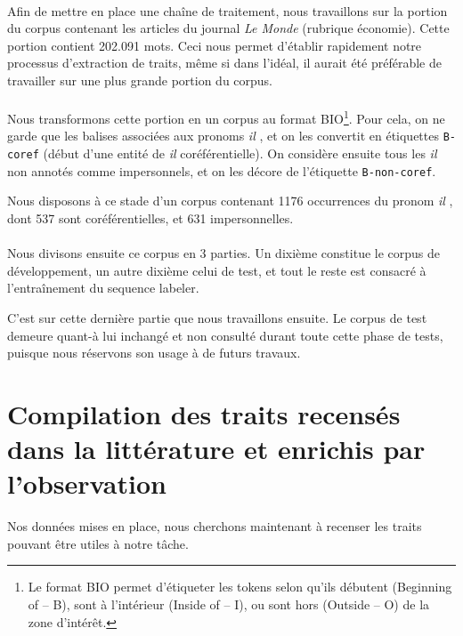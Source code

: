 \documentclass[a4paper,12pt]{article}
\begin{document}
\paragraph{}
Afin de mettre en place une chaîne de traitement, nous travaillons sur la portion du corpus contenant les articles du journal \emph{Le Monde} (rubrique économie). Cette portion contient 202.091 mots. Ceci nous permet d'établir rapidement notre processus d'extraction de traits, même si dans l'idéal, il aurait été préférable de travailler sur une plus grande portion du corpus.

\paragraph{}
Nous transformons cette portion en un corpus au format BIO\footnote{Le format BIO permet d'étiqueter les tokens selon qu'ils débutent (Beginning of -- B), sont à l'intérieur (Inside of -- I), ou sont hors (Outside -- O) de la zone d'intérêt.}. Pour cela, on ne garde que les balises associées aux pronoms \og \textit{il} \fg{}, et on les convertit en étiquettes \verb!B-coref! (début d'une entité de \og \textit{il} \fg{} coréférentielle). On considère ensuite tous les \og \textit{il} \fg{} non annotés comme impersonnels, et on les décore de l'étiquette \verb!B-non-coref!.

Nous disposons à ce stade d'un corpus contenant 1176 occurrences du pronom \og \textit{il} \fg{}, dont 537 sont coréférentielles, et 631 impersonnelles.

\paragraph{}
Nous divisons ensuite ce corpus en 3 parties. Un dixième constitue le corpus de développement, un autre dixième celui de test, et tout le reste est consacré à l'entraînement du sequence labeler.


C'est sur cette dernière partie que nous travaillons ensuite.
Le corpus de test demeure quant-à lui inchangé et non consulté durant toute cette phase de tests, puisque nous réservons son usage à de futurs travaux.

\section{Compilation des traits recensés dans la littérature et enrichis par l'observation}

Nos données mises en place, nous cherchons maintenant à recenser les traits pouvant être utiles à notre tâche.
\end{document}
